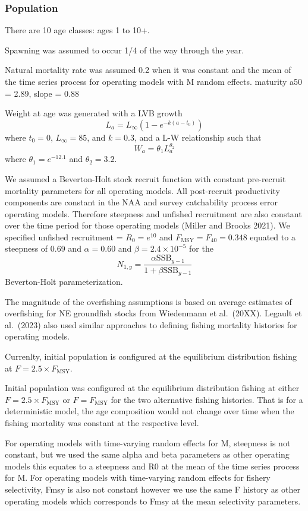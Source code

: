 \documentclass[
  12pt,
]{article}
\begin{document}
\hypertarget{population}{%
\subsubsection{Population}\label{population}}

There are 10 age classes: ages 1 to 10+.

Spawning was assumed to occur 1/4 of the way through the year.

Natural mortality rate was assumed 0.2 when it was constant and the mean
of the time series process for operating models with M random effects.
maturity a50 = 2.89, slope = 0.88

Weight at age was generated with a LVB growth \[
L_a = L_{\infty}\left(1 - e^{-k(a - t_0)}\right)
\] where \(t_0 = 0\), \(L_\infty = 85\), and \(k = 0.3\), and a L-W
relationship such that \[
W_a = \theta_1 L_a^{\theta_2}
\] where \(\theta_1 = e^{-12.1}\) and \(\theta_2 = 3.2\).

We assumed a Beverton-Holt stock recruit function with constant
pre-recruit mortality parameters for all operating models. All
post-recruit productivity components are constant in the NAA and survey
catchability process error operating models. Therefore steepness and
unfished recruitment are also constant over the time period for those
operating models (Miller and Brooks 2021). We specified unfished
recruitment = \(R_0 = e^{10}\) and \(F_{\text{MSY}} = F_{40} = 0.348\)
equated to a steepness of 0.69 and \(\alpha=0.60\) and
\(\beta = 2.4 \times 10^{-5}\) for the \[
N_{1,y} = \frac{\alpha \text{SSB}_{y-1}}{1 + \beta \text{SSB}_{y-1}} 
\] Beverton-Holt parameterization.

The magnitude of the overfishing assumptions is based on average
estimates of overfishing for NE groundfish stocks from Wiedenmann et
al.~(20XX). Legault et al.~(2023) also used similar approaches to
defining fishing mortality histories for operating models.

Currenlty, initial population is configured at the equilibrium
distribution fishing at \(F = 2.5\times F_{\text{MSY}}\).

Initial population was configured at the equilibrium distribution
fishing at either \(F = 2.5\times F_{\text{MSY}}\) or
\(F = F_{\text{MSY}}\) for the two alternative fishing histories. That
is for a deterministic model, the age composition would not change over
time when the fishing mortality was constant at the respective level.

For operating models with time-varying random effects for M, steepness
is not constant, but we used the same alpha and beta parameters as other
operating models this equates to a steepness and R0 at the mean of the
time series process for M. For operating models with time-varying random
effects for fishery selectivity, Fmsy is also not constant however we
use the same F history as other operating models which corresponds to
Fmsy at the mean selectivity parameters.
\end{document}
